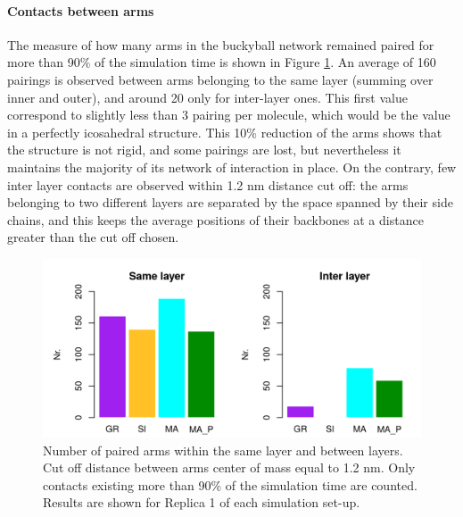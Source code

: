 \paragraph{Contacts between arms} The measure of how many arms in the buckyball network remained paired for more than 90\% of the simulation time is shown in Figure \ref{fig:BTI_beta}. An average of 160 pairings is observed between arms belonging to the same layer (summing over inner and outer), and around 20 only for inter-layer ones.
%
This first value correspond to slightly less than 3 pairing per molecule, which would be the value in a perfectly icosahedral structure. This 10\% reduction of the arms shows that the structure is not rigid, and some pairings are lost, but nevertheless it maintains the majority of its network of interaction in place.
%
On the contrary, few inter layer contacts are observed within 1.2 nm distance cut off: the arms belonging to two different layers are separated by the space spanned by their side chains, and this keeps the average positions of their backbones at a distance greater than the cut off chosen.
%
\begin{figure}[t!]
\centering
\includegraphics[width=0.85\linewidth]{3results_capsule/pics/stAll_beta_90_R1.png}
\caption[Arm pairing during simulations of the buckyball]{Number of paired arms within the same layer and between layers. Cut off distance between arms center of mass equal to 1.2 nm. Only contacts existing more than 90\% of the simulation time are counted. Results are shown for Replica 1 of each simulation set-up.}
\label{fig:BTI_beta}
\end{figure}

